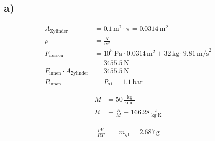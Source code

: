 

\subsection*{a)}

\begin{align*}
A_{\text{Zylinder}} &= 0.1\,\text{m}^2 \cdot \pi = 0.0314\,\text{m}^2 \\
\rho &= \frac{N}{m^2} \\
F_{\text{aussen}} &= 10^5\,\text{Pa} \cdot 0.0314\,\text{m}^2 + 32\,\text{kg} \cdot 9.81\,\text{m/s}^2 \\
&= 3455.5\,\text{N} \\
F_{\text{innen}} \cdot A_{\text{Zylinder}} &= 3455.5\,\text{N} \\
P_{\text{innen}} &= P_{a1} = 1.1\,\text{bar}
\end{align*}

\begin{align*}
M &= 50\,\frac{\text{kg}}{\text{kmol}} \\
R &= \frac{\bar{R}}{M} = 166.28\,\frac{\text{J}}{\text{kg} \cdot \text{K}}
\end{align*}

\begin{align*}
\frac{pV}{RT} &= m_{g1} = \underline{2.687\,\text{g}}
\end{align*}